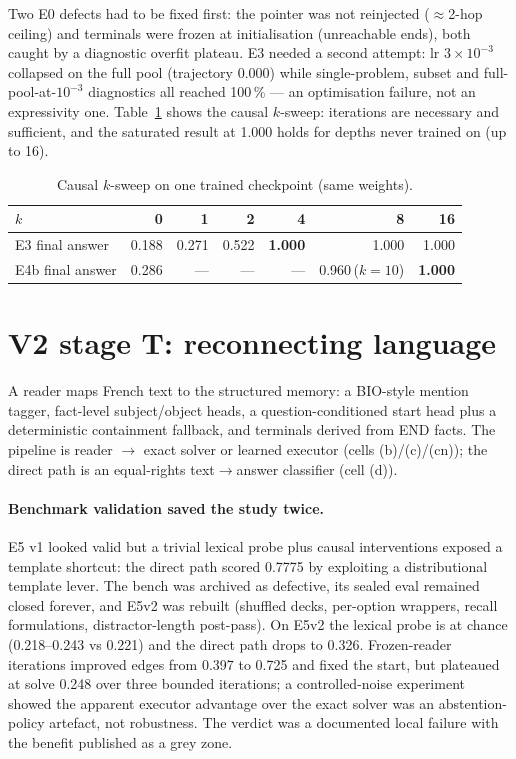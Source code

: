 \documentclass[11pt,a4paper]{article}
\begin{document}
Two E0 defects had to be fixed first: the pointer was not reinjected ($\approx$2-hop ceiling) and terminals were frozen at initialisation (unreachable ends), both caught by a diagnostic overfit plateau. E3 needed a second attempt: lr $3\times10^{-3}$ collapsed on the full pool (trajectory 0.000) while single-problem, subset and full-pool-at-$10^{-3}$ diagnostics all reached 100\,\% --- an optimisation failure, not an expressivity one. Table~\ref{tab:ksweep} shows the causal $k$-sweep: iterations are necessary and sufficient, and the saturated result at 1.000 holds for depths never trained on (up to 16).

\begin{table}[t]
\centering
\caption{Causal $k$-sweep on one trained checkpoint (same weights).}
\label{tab:ksweep}
\small
\begin{tabular}{lrrrrrr}
\toprule
$k$ & 0 & 1 & 2 & 4 & 8 & 16 \\
\midrule
E3 final answer & 0.188 & 0.271 & 0.522 & \textbf{1.000} & 1.000 & 1.000 \\
E4b final answer & 0.286 & --- & --- & --- & 0.960\,($k{=}10$) & \textbf{1.000} \\
\bottomrule
\end{tabular}
\end{table}

\section{V2 stage T: reconnecting language}
\label{sec:t}

A reader maps French text to the structured memory: a BIO-style mention tagger, fact-level subject/object heads, a question-conditioned start head plus a deterministic containment fallback, and terminals derived from END facts. The pipeline is reader $\to$ exact solver or learned executor (cells (b)/(c)/(cn)); the direct path is an equal-rights text$\to$answer classifier (cell (d)).

\paragraph{Benchmark validation saved the study twice.} E5 v1 looked valid but a trivial lexical probe plus causal interventions exposed a template shortcut: the direct path scored 0.7775 by exploiting a distributional template lever. The bench was archived as defective, its sealed eval remained closed forever, and E5v2 was rebuilt (shuffled decks, per-option wrappers, recall formulations, distractor-length post-pass). On E5v2 the lexical probe is at chance (0.218--0.243 vs 0.221) and the direct path drops to 0.326. Frozen-reader iterations improved edges from 0.397 to 0.725 and fixed the start, but plateaued at solve 0.248 over three bounded iterations; a controlled-noise experiment showed the apparent executor advantage over the exact solver was an abstention-policy artefact, not robustness. The verdict was a documented local failure with the benefit published as a grey zone.
\end{document}

